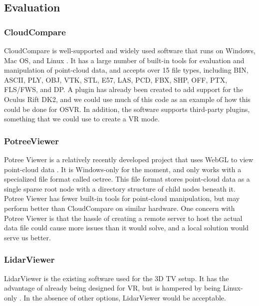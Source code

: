 \documentclass{article}
\begin{document}
\subsection{Evaluation}
\subsubsection{CloudCompare}
CloudCompare is well-supported and widely used software that runs on Windows, Mac OS, and Linux \cite{cloudcompare}.
It has a large number of built-in tools for evaluation and manipulation of point-cloud data, and accepts over 15 file types, including BIN, ASCII, PLY, OBJ, VTK, STL, E57, LAS, PCD, FBX, SHP, OFF, PTX, FLS/FWS, and DP. 
A plugin has already been created to add support for the Oculus Rift DK2, and we could use much of this code as an example of how this could be done for OSVR. 
In addition, the software supports third-party plugins, something that we could use to create a VR mode. 

\subsubsection{PotreeViewer}
Potree Viewer is a relatively recently developed project that uses WebGL to view point-cloud data \cite{potree}.
It is Windows-only for the moment, and only works with a specialized file format called octree. 
This file format stores point-cloud data as a single sparse root node with a directory structure of child nodes beneath it. 
Potree Viewer has fewer built-in tools for point-cloud manipulation, but may perform better than CloudCompare on similar hardware. 
One concern with Potree Viewer is that the hassle of creating a remote server to host the actual data file could cause more issues than it would solve, and a local solution would serve us better.

\subsubsection{LidarViewer}
LidarViewer is the existing software used for the 3D TV setup. It has the advantage of already being designed for VR, but is hampered by being Linux-only \cite{lidarviewer}.
In the absence of other options, LidarViewer would be acceptable.
\end{document}
